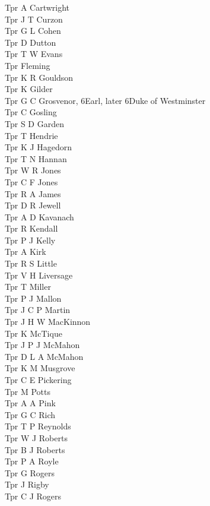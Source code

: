 \begin{multicols}{2}
  Tpr A Cartwright \\
  Tpr J T Curzon \\
  Tpr G L Cohen \\
  Tpr D Dutton \\
  Tpr T W Evans \\
  Tpr Fleming \\
  Tpr K R Gouldson \\
  Tpr K Gilder \\
  Tpr G C Grosvenor, 6\nth Earl, later 6\nth Duke of Westminster \\
  Tpr C Gosling \\
  Tpr S D Garden \\
  Tpr T Hendrie \\
  Tpr K J Hagedorn \\
  Tpr T N Hannan \\
  Tpr W R Jones \\
  Tpr C F Jones \\
  Tpr R A James \\
  Tpr D R Jewell \\
  Tpr A D Kavanach \\
  Tpr R Kendall \\
  Tpr P J Kelly \\
  Tpr A Kirk \\
  Tpr R S Little \\
  Tpr V H Liversage \\
  Tpr T Miller \\
  Tpr P J Mallon \\
  Tpr J C P Martin \\
  Tpr J H W MacKinnon \\
  Tpr K McTique \\
  Tpr J P J McMahon \\
  Tpr D L A McMahon \\
  Tpr K M Musgrove \\
  Tpr C E Pickering \\
  Tpr M Potts \\
  Tpr A A Pink \\
  Tpr G C Rich \\
  Tpr T P Reynolds \\
  Tpr W J Roberts \\
  Tpr B J Roberts \\
  Tpr P A Royle \\
  Tpr G Rogers \\
  Tpr J Rigby \\
  Tpr C J Rogers \\

\end{multicols}
